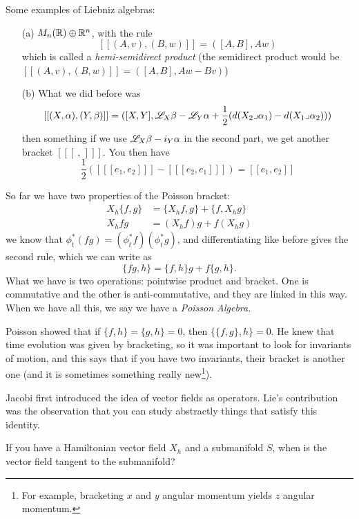  Some examples of Liebniz algebras:
 \begin{itemize}
 \item[(a)] $M_n(\mathbb{R})\oplus \mathbb{R}^n$, with the rule
 \[
    [[(A,v),(B,w)]] = ([A,B],Aw)
 \]
 which is called a \emph{hemi-semidirect product}  (the semidirect
 product would be $    [[(A,v),(B,w)]] = ([A,B],Aw-Bv)$)
 \item[(b)]  What we did before was
 \[
    [[(X,\alpha),(Y,\beta)]] = ([X,Y],\mathscr{L}_X \beta - \mathscr{L}_Y\alpha +
    \frac{1}{2}(d(X_2\lrcorner \alpha_1) - d(X_1\lrcorner
    \alpha_2)))
 \]
 then something if we use $\mathscr{L}_X\beta -i_Y\alpha$ in the second
 part, we get another bracket $[[[\ ,\, ]]]$.  You then have
 \[
    \frac{1}{2}([[[e_1,e_2]]] - [[[e_2,e_1]]]) = [[e_1,e_2]]
 \]
 \end{itemize}

 So far we have two properties of the Poisson bracket:
 \begin{align*}
   X_h\{f,g\} &= \{X_hf,g\} + \{f,X_h g\}\\
   X_h fg &= (X_hf)g + f(X_hg)
 \end{align*}
 we know that $\phi_t^*(fg)=(\phi_t^* f)(\phi_t^*g)$, and
 differentiating like before gives the second rule, which we can
 write as
 \[
    \{fg,h\} = \{f,h\}g + f\{g,h\}.
 \]
 What we have is two operations: pointwise product and bracket.
 One is commutative and the other is anti-commutative, and they
 are linked in this way.  When we have all this, we say we have a
 \emph{Poisson Algebra}.

 Poisson showed that if $\{f,h\}=\{g,h\}=0$, then
 $\{\{f,g\},h\}=0$.  He knew that time evolution was given by
 bracketing, so it was important to look for invariants of motion,
 and this says that if you have two invariants, their bracket is
 another one (and it is sometimes something really
 new\footnote{For example, bracketing $x$ and $y$ angular momentum
 yields $z$ angular momentum.}).

 Jacobi first introduced the idea of vector fields as operators.
 Lie's contribution was  the observation that you can study
 abstractly things that satisfy this identity.

 If you have a Hamiltonian vector field $X_h$ and a submanifold $S$, when is
 the vector field tangent to the submanifold?

